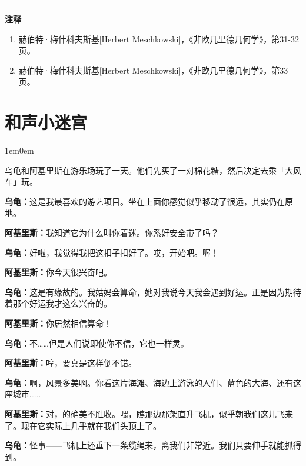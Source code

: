 \documentclass[
  12pt,
  twoside,
  openright,
  oldfontcommands,
]{memoir}
\newcommand{\dialogname}[1]{{\heifamily\bfseries #1}}
\newenvironment{dialogguide}{%
  \begin{adjustwidth}{1em}{0em}\kaitifamily\itshape\small%
}{%
  \end{adjustwidth}%
}
\begin{document}
{\footnotesize\setlength{\parindent}{0pt}%
\noindent\textcolor{rulegray}{\rule{0.35\linewidth}{0.3pt}}\par\vspace{2pt}
\noindent\textbf{注释}\par\vspace{3pt}
\begin{enumerate}
\label{fn:Chapter04-1}{}
\item 赫伯特·梅什科夫斯基[Herbert Meschkowski]，《非欧几里德几何学》，第31-32页。
\label{fn:Chapter04-2}{}
\item 赫伯特·梅什科夫斯基[Herbert Meschkowski]，《非欧几里德几何学》，第33页。
\end{enumerate}
}

\label{Dialog05.xhtml}{}

\chapter*{和声小迷宫}

\begin{dialogguide}
乌龟和阿基里斯在游乐场玩了一天。他们先买了一对棉花糖，然后决定去乘「大风车」玩。
\end{dialogguide}

\dialogname{乌龟：}这是我最喜欢的游艺项目。坐在上面你感觉似乎移动了很远，其实仍在原地。

\dialogname{阿基里斯：}我知道它为什么叫你着迷。你系好安全带了吗？

\dialogname{乌龟：}好啦，我觉得我把这扣子扣好了。哎，开始吧。喔！

\dialogname{阿基里斯：}你今天很兴奋吧。

\dialogname{乌龟：}这是有缘故的。我姑妈会算命，她对我说今天我会遇到好运。正是因为期待着那个好运我才这么兴奋的。

\dialogname{阿基里斯：}你居然相信算命！

\dialogname{乌龟：}不\ldots\ldots 但是人们说即使你不信，它也一样灵。

\dialogname{阿基里斯：}哼，要真是这样倒不错。

\dialogname{乌龟：}啊，风景多美啊。你看这片海滩、海边上游泳的人们、蓝色的大海、还有这座城市\ldots\ldots{}

\dialogname{阿基里斯：}对，的确美不胜收。喂，瞧那边那架直升飞机，似乎朝我们这儿飞来了。现在它实际上几乎就在我们头顶上了。

\dialogname{乌龟：}怪事------飞机上还垂下一条缆绳来，离我们非常近。我们只要伸手就能抓得到。
\end{document}
